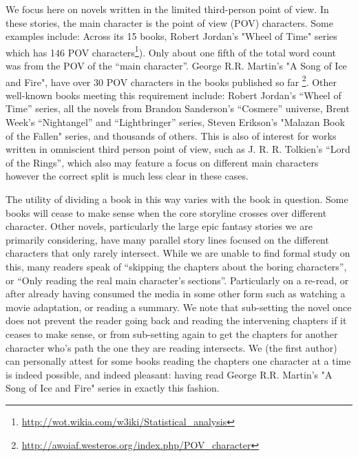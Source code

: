 \documentclass[11pt,a4paper]{article}
\begin{document}
We focus here on novels written in the limited third-person point of view.
In these stories, the main character is the point of view (POV) characters.
Some examples include: 
Across its 15 books, Robert Jordan's "Wheel of Time" series which has 146 POV characters\footnote{\url{http://wot.wikia.com/w3iki/Statistical_analysis}}). Only about one fifth of the total word count was from the POV of the ``main character''.
George R.R. Martin's "A Song of Ice and Fire", have over 30 POV characters in the books published so far \footnote{\url{http://awoiaf.westeros.org/index.php/POV_character}}.
Other well-known books meeting this requirement include:
Robert Jordan's ``Wheel of Time'' series, all the novels from Brandon Sanderson's ``Cosmere'' universe, Brent Week's ``Nightangel'' and ``Lightbringer'' series,
Steven Erikson's "Malazan Book of the Fallen" series, and thousands of others.
This is also of interest for works written in omniscient third person point of view, such as J. R. R. Tolkien's ``Lord of the Rings'',
which also may feature a focus on different main characters however the correct split is much less clear in these cases.

The utility of dividing a book in this way varies with the book in question.
Some books will cease to make sense when the core storyline crosses over different character.
Other novels, particularly the large epic fantasy stories we are primarily considering,
have many parallel story lines focused on the different characters that only rarely intersect.
While we are unable to find formal study on this, 
many readers speak of ``skipping the chapters about the boring characters'',
or ``Only reading the real main character's sections''.
Particularly on a re-read, or after already having consumed the media in some other form such as watching a movie adaptation, or reading a summary.
We note that sub-setting the novel once does not prevent the reader going back and reading the intervening chapters if it ceases to make sense, or from sub-setting again to get the chapters for another character who's path the one they are reading intersects.
We (the first author) can personally attest for some books reading the chapters one character at a time is indeed possible, and indeed pleasant: having read George R.R. Martin's "A Song of Ice and Fire" series in exactly this fashion.
\end{document}
